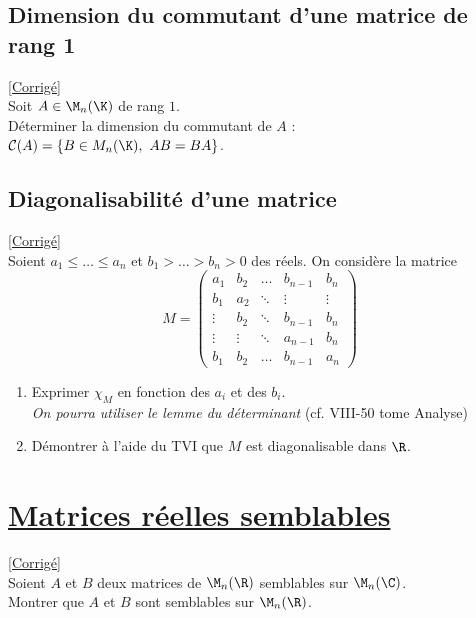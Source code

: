 \documentclass[8pt]{book}
\begin{document}
	\subsection{Dimension du commutant d'une matrice de rang 1 }
	\label{Dimension du commutant d'une matrice de rang 1}
	\textcolor{blue}{\hyperref[Dimension du commutant d'une matrice de rang 1 corrigé]{[Corrigé]}}\\
	Soit $A\in \M_n(\K)$ de rang $1$.\\
	Déterminer la dimension du commutant de $A$ : $\mathcal C(A)=\{B\in M_n(\K),\ AB=BA\}$.
	
	\subsection{Diagonalisabilité d'une matrice }
	\label{Diagonalisabilité d'une matrice}
	\textcolor{blue}{\hyperref[Diagonalisabilité d'une matrice corrigé]{[Corrigé]}}\\
	Soient $a_1\leq \dots\leq a_n$ et $b_1>\dots>b_n>0$ des réels. On considère la matrice
	$$M=\begin{pmatrix}
		a_1   &b_2   &\dots &b_{n-1}&b_n\\
		b_1   &a_2   &\ddots&\vdots &\vdots\\
		\vdots&b_2   &\ddots&b_{n-1}&b_n\\
		\vdots&\vdots&\ddots&a_{n-1}&b_n\\
		b_1   &b_2   &\dots &b_{n-1}&a_n
	\end{pmatrix}$$
	\begin{enumerate}
		\item Exprimer $\chi_M$ en fonction des $a_i$ et des $b_i$.\\ \textit{On pourra utiliser le lemme du déterminant} (cf. VIII-50 tome Analyse)
		\item Démontrer à l'aide du TVI que $M$ est diagonalisable dans $\R$.
	\end{enumerate}
	
	\section{\underline{Matrices réelles semblables} }
	\label{Matrices réelles semblables}
	\textcolor{blue}{\hyperref[Matrices réelles semblables corrigé]{[Corrigé]}}\\
	Soient $A$ et $B$ deux matrices de $\M_n(\R)$ semblables sur $\M_n(\C)$.\\
	Montrer que $A$ et $B$ sont semblables sur $\M_n(\R)$.
	
\end{document}
